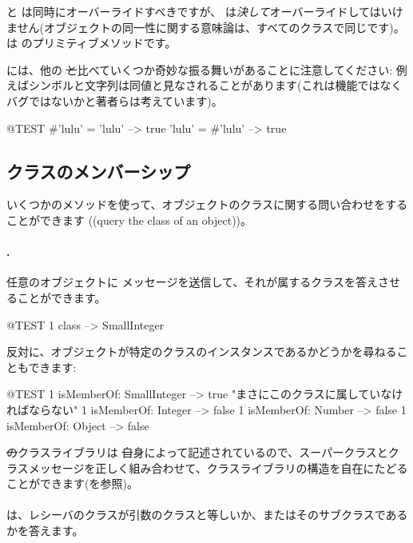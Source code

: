 \documentclass[a4paper,10pt,twoside]{book}
\begin{document}
\ct{=} と  は同時にオーバーライドすべきですが、\ct{==} は\emph{決して}オーバーライドしてはいけません(オブジェクトの同一性に関する意味論は、すべてのクラスで同じです)。\ct{==} は  のプリミティブメソッドです。

\pharo には、他の \st と比べていくつか奇妙な振る舞いがあることに注意してください: 例えばシンボルと文字列は同値と見なされることがあります(これは機能ではなくバグではないかと著者らは考えています)。

\begin{code}{@TEST}
#'lulu' = 'lulu' --> true
'lulu' = #'lulu' --> true
\end{code}


\subsection{クラスのメンバーシップ}
いくつかのメソッドを使って、オブジェクトのクラスに関する問い合わせをすることができます ((query the class of an object))。

\paragraph{.} 任意のオブジェクトに  メッセージを送信して、それが属するクラスを答えさせることができます。
\begin{code}{@TEST}
1 class --> SmallInteger
\end{code}

反対に、オブジェクトが特定のクラスのインスタンスであるかどうかを尋ねることもできます:
\begin{code}{@TEST}
1 isMemberOf: SmallInteger --> true    "まさにこのクラスに属していなければならない"
1 isMemberOf: Integer          --> false
1 isMemberOf: Number        --> false
1 isMemberOf: Object           --> false
\end{code}

\st のクラスライブラリは \st 自身によって記述されているので、スーパークラスとクラスメッセージを正しく組み合わせて、クラスライブラリの構造を自在にたどることができます(を参照)。

\paragraph{}
 は、レシーバのクラスが引数のクラスと等しいか、またはそのサブクラスであるかを答えます。
\end{document}
